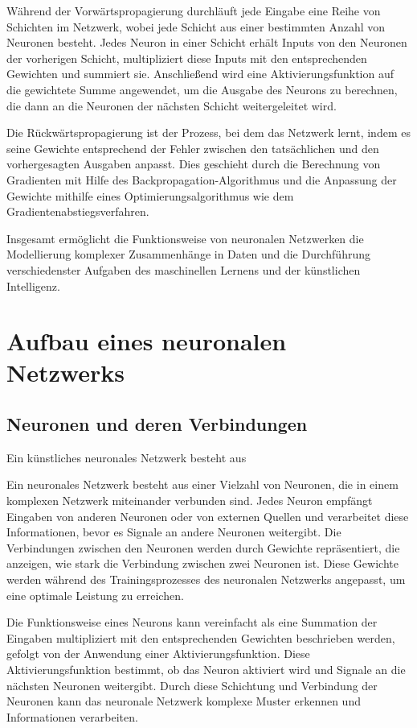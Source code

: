 Während der Vorwärtspropagierung durchläuft jede Eingabe eine Reihe von Schichten im Netzwerk, wobei jede Schicht aus einer bestimmten Anzahl von Neuronen besteht. Jedes Neuron in einer Schicht erhält Inputs von den Neuronen der vorherigen Schicht, multipliziert diese Inputs mit den entsprechenden Gewichten und summiert sie. Anschließend wird eine Aktivierungsfunktion auf die gewichtete Summe angewendet, um die Ausgabe des Neurons zu berechnen, die dann an die Neuronen der nächsten Schicht weitergeleitet wird.

Die Rückwärtspropagierung ist der Prozess, bei dem das Netzwerk lernt, indem es seine Gewichte entsprechend der Fehler zwischen den tatsächlichen und den vorhergesagten Ausgaben anpasst. Dies geschieht durch die Berechnung von Gradienten mit Hilfe des Backpropagation-Algorithmus und die Anpassung der Gewichte mithilfe eines Optimierungsalgorithmus wie dem Gradientenabstiegsverfahren.

Insgesamt ermöglicht die Funktionsweise von neuronalen Netzwerken die Modellierung komplexer Zusammenhänge in Daten und die Durchführung verschiedenster Aufgaben des maschinellen Lernens und der künstlichen Intelligenz.

\section{Aufbau eines neuronalen Netzwerks}
\label{sec:Grundlagen_Aufbau_neuronale_Netzwerke}
\subsection{Neuronen und deren Verbindungen}
\label{sec:Grundlagen_neuronen_und_Verbindungen}

Ein künstliches neuronales Netzwerk besteht aus 

Ein neuronales Netzwerk besteht aus einer Vielzahl von Neuronen, die in einem komplexen Netzwerk miteinander verbunden sind. Jedes Neuron empfängt Eingaben von anderen Neuronen oder von externen Quellen und verarbeitet diese Informationen, bevor es Signale an andere Neuronen weitergibt. Die Verbindungen zwischen den Neuronen werden durch Gewichte repräsentiert, die anzeigen, wie stark die Verbindung zwischen zwei Neuronen ist. Diese Gewichte werden während des Trainingsprozesses des neuronalen Netzwerks angepasst, um eine optimale Leistung zu erreichen.

Die Funktionsweise eines Neurons kann vereinfacht als eine Summation der Eingaben multipliziert mit den entsprechenden Gewichten beschrieben werden, gefolgt von der Anwendung einer Aktivierungsfunktion. Diese Aktivierungsfunktion bestimmt, ob das Neuron aktiviert wird und Signale an die nächsten Neuronen weitergibt. Durch diese Schichtung und Verbindung der Neuronen kann das neuronale Netzwerk komplexe Muster erkennen und Informationen verarbeiten.

